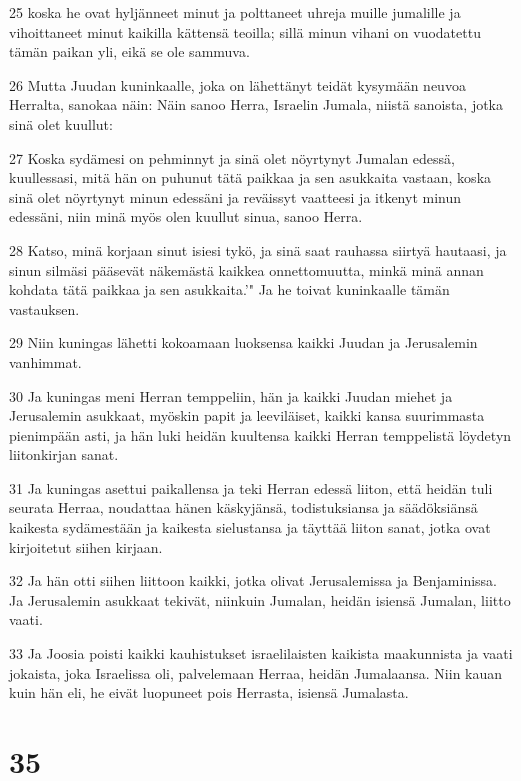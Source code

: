 \par 25 koska he ovat hyljänneet minut ja polttaneet uhreja muille jumalille ja vihoittaneet minut kaikilla kättensä teoilla; sillä minun vihani on vuodatettu tämän paikan yli, eikä se ole sammuva.
\par 26 Mutta Juudan kuninkaalle, joka on lähettänyt teidät kysymään neuvoa Herralta, sanokaa näin: Näin sanoo Herra, Israelin Jumala, niistä sanoista, jotka sinä olet kuullut:
\par 27 Koska sydämesi on pehminnyt ja sinä olet nöyrtynyt Jumalan edessä, kuullessasi, mitä hän on puhunut tätä paikkaa ja sen asukkaita vastaan, koska sinä olet nöyrtynyt minun edessäni ja reväissyt vaatteesi ja itkenyt minun edessäni, niin minä myös olen kuullut sinua, sanoo Herra.
\par 28 Katso, minä korjaan sinut isiesi tykö, ja sinä saat rauhassa siirtyä hautaasi, ja sinun silmäsi pääsevät näkemästä kaikkea onnettomuutta, minkä minä annan kohdata tätä paikkaa ja sen asukkaita.'" Ja he toivat kuninkaalle tämän vastauksen.
\par 29 Niin kuningas lähetti kokoamaan luoksensa kaikki Juudan ja Jerusalemin vanhimmat.
\par 30 Ja kuningas meni Herran temppeliin, hän ja kaikki Juudan miehet ja Jerusalemin asukkaat, myöskin papit ja leeviläiset, kaikki kansa suurimmasta pienimpään asti, ja hän luki heidän kuultensa kaikki Herran temppelistä löydetyn liitonkirjan sanat.
\par 31 Ja kuningas asettui paikallensa ja teki Herran edessä liiton, että heidän tuli seurata Herraa, noudattaa hänen käskyjänsä, todistuksiansa ja säädöksiänsä kaikesta sydämestään ja kaikesta sielustansa ja täyttää liiton sanat, jotka ovat kirjoitetut siihen kirjaan.
\par 32 Ja hän otti siihen liittoon kaikki, jotka olivat Jerusalemissa ja Benjaminissa. Ja Jerusalemin asukkaat tekivät, niinkuin Jumalan, heidän isiensä Jumalan, liitto vaati.
\par 33 Ja Joosia poisti kaikki kauhistukset israelilaisten kaikista maakunnista ja vaati jokaista, joka Israelissa oli, palvelemaan Herraa, heidän Jumalaansa. Niin kauan kuin hän eli, he eivät luopuneet pois Herrasta, isiensä Jumalasta.

\chapter{35}

